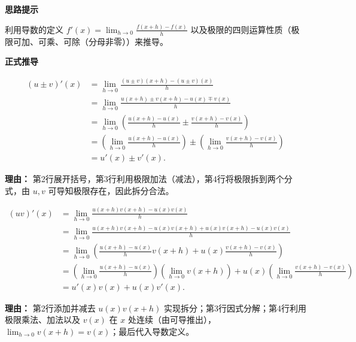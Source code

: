 \begin{proofbox}

	\textbf{\textcolor{CProof}{思路提示}}

	利用导数的定义 $\displaystyle f'(x)=\lim_{h\to 0}\frac{f(x+h)-f(x)}{h}$ 以及极限的四则运算性质（极限可加、可乘、可除（分母非零））来推导。

	\medskip
	\textbf{\textcolor{CProof}{正式推导}}
	\begin{description}[style=nextline, leftmargin=2.8em, labelsep=0.5em, itemsep=0.55em]
		\item[\textbf{步骤一（和差证明）：}]
			\[
				\begin{aligned}
					(u\pm v)'(x) &= \lim_{h\to 0}\frac{(u\pm v)(x+h)-(u\pm v)(x)}{h} \\
					&= \lim_{h\to 0}\frac{u(x+h)\pm v(x+h)-u(x)\mp v(x)}{h} \\
					&= \lim_{h\to 0}\left(\frac{u(x+h)-u(x)}{h} \pm \frac{v(x+h)-v(x)}{h}\right) \\
					&= \left(\lim_{h\to 0}\frac{u(x+h)-u(x)}{h}\right) \pm \left(\lim_{h\to 0}\frac{v(x+h)-v(x)}{h}\right) \\
					&= u'(x) \pm v'(x).
			\end{aligned}
			\]
			\par\textbf{理由：}
			第2行展开括号，第3行利用极限加法（减法），第4行将极限拆到两个分式，由 $u,v$ 可导知极限存在，因此拆分合法。

		\item[\textbf{步骤二（乘积证明）：}]
			\[
				\begin{aligned}
					(uv)'(x) &= \lim_{h\to 0}\frac{u(x+h)v(x+h)-u(x)v(x)}{h} \\
					&= \lim_{h\to 0}\frac{u(x+h)v(x+h)-u(x)v(x+h)+u(x)v(x+h)-u(x)v(x)}{h} \\
					&= \lim_{h\to 0}\left(\frac{u(x+h)-u(x)}{h}v(x+h) + u(x)\frac{v(x+h)-v(x)}{h}\right) \\
					&= \left(\lim_{h\to 0}\frac{u(x+h)-u(x)}{h}\right)\left(\lim_{h\to 0}v(x+h)\right) + u(x)\left(\lim_{h\to 0}\frac{v(x+h)-v(x)}{h}\right) \\
					&= u'(x)v(x) + u(x)v'(x).
			\end{aligned}
			\]
			\par\textbf{理由：}
			第2行添加并减去 $u(x)v(x+h)$ 实现拆分；第3行因式分解；第4行利用极限乘法、加法以及 $v(x)$ 在 $x$ 处连续（由可导推出），$\lim_{h\to 0}v(x+h)=v(x)$；最后代入导数定义。


\end{description}
\end{proofbox}
